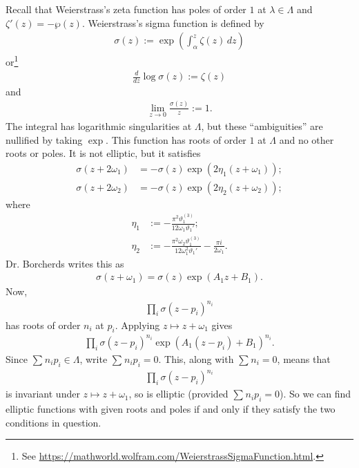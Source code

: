 \documentclass[11pt, oneside,margin=1in]{article}
\begin{document}
Recall that Weierstrass's zeta function has poles of order $1$ at $\lambda\in \Lambda$ and $\zeta' (z) = -\wp (z)$. Weierstrass's sigma function is defined by
\begin{align*}
	\sigma(z) := \exp  \left( \int_{\alpha}^{z} \zeta(z)  \, dz  \right) 
\end{align*}
or\footnote{See \url{https://mathworld.wolfram.com/WeierstrassSigmaFunction.html}.}
\begin{align*}
	\frac{d}{dz}\log \sigma(z):=  \zeta (z) 
\end{align*}
and
\begin{align*}
	\lim_{z\to 0} \frac{\sigma(z)}{z} := 1.
\end{align*}
The integral has logarithmic singularities at $\Lambda$, but these ``ambiguities'' are nullified by taking $\exp$. This function has roots of order $1$ at $\Lambda$ and no other roots or poles. It is not elliptic, but it satisfies
\begin{align*}
	\sigma(z + 2\omega_1) &= -\sigma(z)\exp(2\eta_1(z+\omega_1)) ;\\
	\sigma(z+2\omega_2) &= -\sigma(z)\exp (2\eta_2(z+\omega_2)) ;
\end{align*}
where
\begin{align*}
	\eta_1 &:= -\frac{\pi^2\vartheta_1^{(3)}}{12\omega_1\vartheta_1'};\\
	\eta_2 &:= - \frac{\pi^2\omega_2\vartheta_1^{(3)}}{12\omega_1^2\vartheta_1'}- \frac{\pi i }{2\omega_1}.
\end{align*}
Dr. Borcherds writes this as
\begin{align*}
	\sigma(z+\omega_1) = \sigma(z) \exp (A_1z+B_1).
\end{align*}
Now,
\begin{align*}
	\prod_i \sigma(z-p_i) ^{n_i}
\end{align*}
has roots of order $n_i$ at $p_i$. Applying $z\longmapsto z+\omega_1$ gives \begin{align*}
	\prod_i \sigma(z-p_i) ^{n_i} \exp(A_1(z-p_i) + B_1) ^{n_i}.
\end{align*}
Since $\sum_{}^{} n_ip_i\in \Lambda$, write $\sum_{}^{} n_ip_i = 0$. This, along with $\sum_{}^{} n_i=0$, means that
\begin{align*}
	\prod_i \sigma(z-p_i) ^{n_i}
\end{align*}
is invariant under $z\longmapsto z+\omega_1$, so is elliptic (provided $\sum_{}^{} n_ip_i=0$). So we can find elliptic functions with given roots and poles if and only if they satisfy the two conditions in question.
\end{document}
